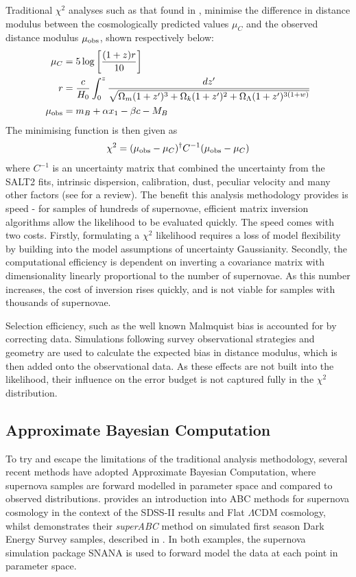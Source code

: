 \documentclass[a4paper,fleqn,usenatbib]{mnras}
\begin{document}
Traditional $\chi^2$ analyses such as that found in \citet{Kowalski2008, Conley2011, Betoule2014}, minimise the difference in distance modulus between the cosmologically predicted values $\mu_C$ and the observed distance modulus $\mu_{\rm obs}$, shown respectively below:
\begin{align}
\mu_C &= 5 \log\left[ \frac{(1+z)r}{10} \right]\\
r& =\frac{c}{H_0} \int_0^z \frac{dz'}{\sqrt{ \Omega_m (1+z')^3 + \Omega_k (1 + z')^2 + \Omega_\Lambda (1+z')^{3(1+w)}}} \label{eq:mu0}\\
\mu_{\rm obs} &= m_B + \alpha x_1 - \beta c - M_B \label{eq:mu1}
\end{align}
The minimising function is then given as
\begin{equation}
\chi^2 = (\mu_{\rm obs} - \mu_C)^\dagger C^{-1} (\mu_{\rm obs} - \mu_C)
\end{equation}
where $C^{-1}$ is an uncertainty matrix that combined the uncertainty from the SALT2 fits, intrinsic dispersion, calibration, dust, peculiar velocity and many other factors (see \citet{Betoule2014} for a review). The benefit this analysis methodology provides is speed - for samples of hundreds of supernovae, efficient matrix inversion algorithms allow the likelihood to be evaluated quickly. The speed comes with two costs. Firstly, formulating a $\chi^2$ likelihood requires a loss of model flexibility by building into the model assumptions of uncertainty Gaussianity. Secondly, the computational efficiency is dependent on inverting a covariance matrix with dimensionality linearly proportional to the number of supernovae. As this number increases, the cost of inversion rises quickly, and is not viable for samples with thousands of supernovae.

Selection efficiency, such as the well known Malmquist bias \citep{MalmquistK.G.1922} is accounted for by correcting data. Simulations following survey observational strategies and geometry are used to calculate the expected bias in distance modulus, which is then added onto the observational data. As these effects are not built into the likelihood, their influence on the error budget is not captured fully in the $\chi^2$ distribution.

\subsection{Approximate Bayesian Computation}

To try and escape the limitations of the traditional analysis methodology, several recent methods have adopted Approximate Bayesian Computation, where supernova samples are forward modelled in parameter space and compared to observed distributions. \citet{Weyant2013} provides an introduction into ABC methods for supernova cosmology in the context of the SDSS-II results \citep{Sako2014} and Flat $\Lambda$CDM cosmology, whilst \citet{Jennings2016} demonstrates their \textit{superABC} method on simulated first season Dark Energy Survey samples, described in \citet{Kessler2015}. In both examples, the supernova simulation package SNANA \citep{Kessler2009a} is used to forward model the data at each point in parameter space.
\end{document}
